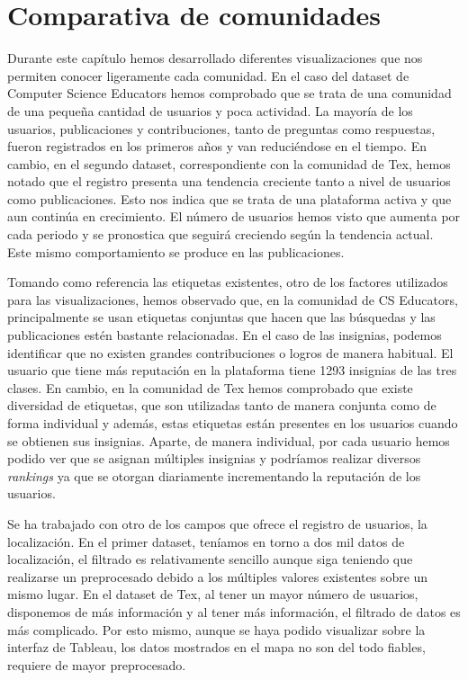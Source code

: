 \documentclass[a4paper, 12pt]{book}
\begin{document}
\clearpage 

\section{Comparativa de comunidades}
\label{chap:compare_community}

Durante este capítulo hemos desarrollado diferentes visualizaciones que nos permiten conocer ligeramente cada comunidad. En el caso del dataset de Computer Science Educators hemos comprobado que se trata de una comunidad de una pequeña cantidad de usuarios y poca actividad. La mayoría de los usuarios, publicaciones y contribuciones, tanto de preguntas como respuestas, fueron registrados en los primeros años y van reduciéndose en el tiempo. En cambio, en el segundo dataset, correspondiente con la comunidad de Tex, hemos notado que el registro presenta una tendencia creciente tanto a nivel de usuarios como publicaciones. Esto nos indica que se trata de una plataforma activa y que aun continúa en crecimiento. El número de usuarios hemos visto que aumenta por cada periodo y se pronostica que seguirá creciendo según la tendencia actual. Este mismo comportamiento se produce en las publicaciones.

Tomando como referencia las etiquetas existentes, otro de los factores utilizados para las visualizaciones, hemos observado que, en la comunidad de CS Educators, principalmente se usan etiquetas conjuntas que hacen que las búsquedas y las publicaciones estén bastante relacionadas. En el caso de las insignias, podemos identificar que no existen grandes contribuciones o logros de manera habitual. El usuario que tiene más reputación en la plataforma tiene 1293 insignias de las tres clases.
En cambio, en la comunidad de Tex hemos comprobado que existe diversidad de etiquetas, que son utilizadas tanto de manera conjunta como de forma individual y además, estas etiquetas están presentes en los usuarios cuando se obtienen sus insignias. Aparte, de manera individual, por cada usuario hemos podido ver que se asignan múltiples insignias y podríamos realizar diversos \emph{rankings} ya que se otorgan diariamente incrementando la reputación de los usuarios. 

Se ha trabajado con otro de los campos que ofrece el registro de usuarios, la localización. En el primer dataset, teníamos en torno a dos mil datos de localización, el filtrado es relativamente sencillo aunque siga teniendo que realizarse un preprocesado debido a los múltiples valores existentes sobre un mismo lugar.  En el dataset de Tex, al tener un mayor número de usuarios, disponemos de más información y al tener más información, el filtrado de datos es más complicado. Por esto mismo, aunque se haya podido visualizar sobre la interfaz de Tableau, los datos mostrados en el mapa no son del todo fiables, requiere de mayor preprocesado. 
\end{document}
